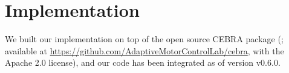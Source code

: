 \section{Implementation}\label{app:implementation}

We built our implementation on top of the open source CEBRA package (\citealp{schneider2023cebra}; available at \url{https://github.com/AdaptiveMotorControlLab/cebra}, with the Apache 2.0 license), and our code has been integrated as of version v0.6.0.




